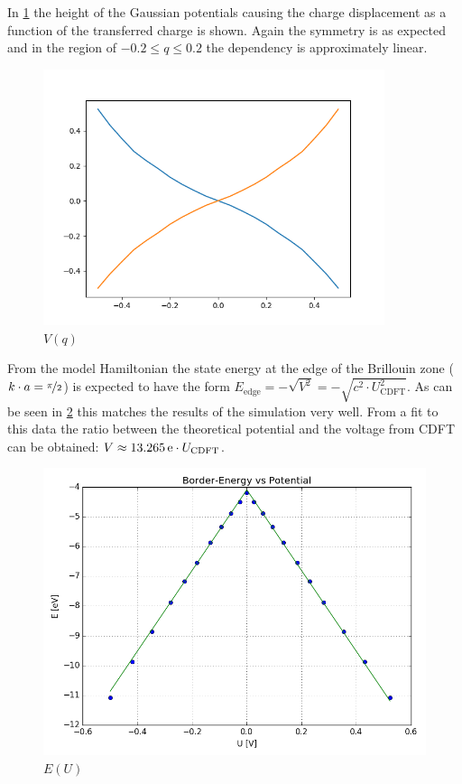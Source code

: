 In \cref{image_hydrogen_charge_potential} the height of the Gaussian potentials causing the charge displacement as a function of the transferred charge is shown. Again the symmetry is as expected and in the region of $-0.2 \le q \le 0.2$ the dependency is approximately linear.

\begin{figure}
	\centering
	\includegraphics[width = 10cm]{Images/Hydrogen/hydrogen_charge_potential}
	\caption{$V(q)$}
	\label{image_hydrogen_charge_potential}
\end{figure}

From the model Hamiltonian the state energy at the edge of the Brillouin zone ($k\cdot a = \nicefrac{\pi}{2}$) is expected to have the form $E_\text{edge} = -\sqrt{V^2} = -\sqrt{c^2\cdot U_\text{CDFT}^2}$. As can be seen in \cref{image_hydrogen_border_energy_potential} this matches the results of the simulation very well. From a fit to this data the ratio between the theoretical potential and the voltage from CDFT can be obtained: $V \approx \unit[13.265]{e} \cdot U_\text{CDFT}$.

\begin{figure}
	\centering
	\includegraphics[width = 12cm]{Images/Hydrogen/hydrogen_border_energy}
	\caption{$E(U)$}
	\label{image_hydrogen_border_energy_potential}
\end{figure}

